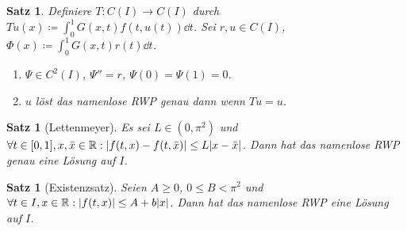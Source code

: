 \documentclass[a4paper]{article}
\theoremstyle{marginbreak}
\newtheorem{satz}[definition]{Satz}
\newcommand{\R}{\mathbb{R}}
\begin{document}
	\begin{satz}
		Definiere $T\colon C(I)\to C(I)$ durch $Tu(x)\coloneqq\int_0^1G(x, t)f(t, u(t))\dd{t}$.
		Sei $r, u\in C(I)$, $\Phi(x)\coloneqq\int_0^1G(x, t)r(t)\dd{t}$.
		\begin{enumerate}[label=(\alph*)]
			\item $\Psi\in C^2(I)$, $\Psi''=r$, $\Psi(0)=\Psi(1)=0$.
			\item $u$ löst das namenlose RWP genau dann wenn $Tu=u$.
		\end{enumerate}
	\end{satz}
	\begin{satz}[Lettenmeyer]
		Es sei $L\in(0,\pi^2)$ und $\forall t\in[0,1], x, \bar{x}\in\R:\abs{f(t, x)-f(t,\bar{x})}\leq L\abs{x-\bar{x}}$.
		Dann hat das namenlose RWP genau eine Lösung auf $I$.
	\end{satz}
	\begin{satz}[Existenzsatz]
		Seien $A\geq 0$, $0\leq B<\pi^2$ und $\forall t\in I, x\in\R:\abs{f(t, x)}\leq A+b\abs{x}$. Dann
		hat das namenlose RWP eine Lösung auf $I$.
	\end{satz}
\end{document}
